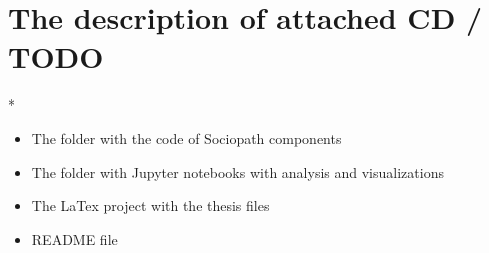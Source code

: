 \chapter*{The description of attached CD / TODO}*
\begin{itemize}
    \item The folder with the code of Sociopath components
    \item The folder with Jupyter notebooks with analysis and visualizations
    \item The LaTex project with the thesis files
    \item README file

\end{itemize}
\label{chap:cd}